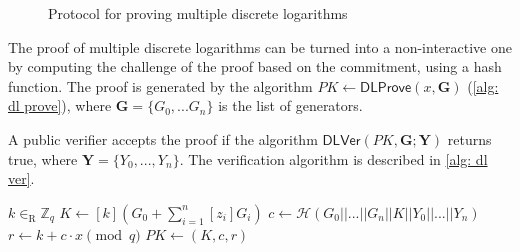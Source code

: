 \begin{figure}[ht]
    \caption{Protocol for proving multiple discrete logarithms}
    \label{fig: protocol for proving multiple discrete logarithms}
\end{figure}

The proof of multiple discrete logarithms can be turned into a non-interactive one by computing the challenge of the proof based on the commitment, using a hash function. The proof is generated by the algorithm $PK \gets \mathsf{DLProve}(x, \boldsymbol{G})$ (\cref{alg: dl prove}), where $\boldsymbol{G} = \{G_0, ... G_n\}$ is the list of generators.

A public verifier accepts the proof if the algorithm $\mathsf{DLVer}(PK, \boldsymbol{G}; \boldsymbol{Y})$ returns true, where $\boldsymbol{Y} = \{Y_0, ..., Y_n\}$. The verification algorithm is described in \cref{alg: dl ver}.

\begin{algorithm}[ht]
    \DontPrintSemicolon
    \caption{$\mathsf{DLProve} (x, \boldsymbol{G})$}
    
    $k \in_\mathrm{R} \mathbb{Z}_q$ \;
    $K \gets [k](G_0 + \sum\limits_{i=1}^n [z_i]G_i)$ \;
    $c \gets \mathcal{H}(G_0 || ... || G_n || K || Y_0 || ... || Y_n)$ \;
    $r \gets k + c \cdot x \pmod q$ \;
    $PK \gets (K, c, r)$ \;
     
    
    \label{alg: dl prove}
\end{algorithm}

